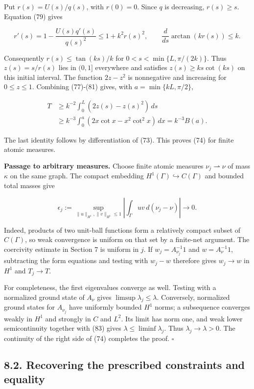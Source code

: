 \documentclass[11pt]{article}
\begin{document}
Put \(r(s)=U(s)/q(s)\), with \(r(0)=0\). Since \(q\) is decreasing,
\(r(s)\ge s\). Equation (79) gives

\[
r'(s)=1-\frac{U(s)q'(s)}{q(s)^2}
\le1+k^2r(s)^2,
\qquad
\frac{d}{ds}\arctan(kr(s))\le k.
\tag{81}
\]

Consequently \(r(s)\le\tan(ks)/k\) for \(0<s<\min\{L,\pi/(2k)\}\). Thus
\(z(s)=s/r(s)\) lies in \((0,1]\) everywhere and satisfies
\(z(s)\ge ks\cot(ks)\) on this initial interval. The function \(2z-z^2\)
is nonnegative and increasing for \(0\le z\le1\). Combining (77)-(81)
gives, with \(a=\min\{kL,\pi/2\}\),

\[
\begin{aligned}
T&\ge k^{-2}\int_0^L(2z(s)-z(s)^2)\,ds\\
&\ge k^{-3}\int_0^a(2x\cot x-x^2\cot^2x)\,dx
 = k^{-3}B(a).
\end{aligned}
\tag{82}
\]

The last identity follows by differentiation of (73). This proves (74)
for finite atomic measures.

\textbf{Passage to arbitrary measures.} Choose finite atomic measures
\(\nu_j\rightharpoonup\nu\) of mass \(\kappa\) on the same graph. The
compact embedding \(H^1(\Gamma)\hookrightarrow C(\Gamma)\) and bounded
total masses give

\[
\epsilon_j:=\sup_{\|u\|_{H^1},\|v\|_{H^1}\le1}
\left|\int_\Gamma uv\,d(\nu_j-\nu)\right|\longrightarrow0.
\tag{83}
\]

Indeed, products of two unit-ball functions form a relatively compact
subset of \(C(\Gamma)\), so weak convergence is uniform on that set by a
finite-net argument. The coercivity estimate in Section 7 is uniform in
\(j\). If \(w_j=A_{\nu_j}^{-1}1\) and \(w=A_\nu^{-1}1\), subtracting the
form equations and testing with \(w_j-w\) therefore gives \(w_j\to w\)
in \(H^1\) and \(T_j\to T\).

For completeness, the first eigenvalues converge as well. Testing with a
normalized ground state of \(A_\nu\) gives
\(\limsup\lambda_j\le\lambda\). Conversely, normalized ground states for
\(A_{\nu_j}\) have uniformly bounded \(H^1\) norms; a subsequence
converges weakly in \(H^1\) and strongly in \(C\) and \(L^2\). Its limit
has norm one, and weak lower semicontinuity together with (83) gives
\(\lambda\le\liminf\lambda_j\). Thus \(\lambda_j\to\lambda>0\). The
continuity of the right side of (74) completes the proof. \(\square\)

\subsection{8.2. Recovering the prescribed constraints and
equality}\label{recovering-the-prescribed-constraints-and-equality}
\end{document}
